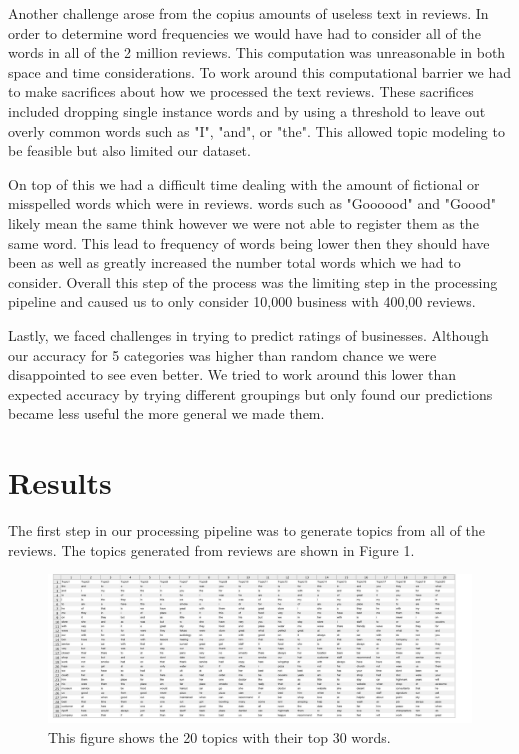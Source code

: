 \documentclass{article}
\begin{document}
Another challenge arose from the copius amounts of useless text in reviews.  In order to determine word frequencies we would have had to consider all of the words in all of the 2 million reviews.  This computation was unreasonable in both space and time considerations.  To work around this computational barrier we had to make sacrifices about how we processed the text reviews.  These sacrifices included dropping single instance words and by using a threshold to leave out overly common words such as "I", "and", or "the".  This allowed topic modeling to be feasible but also limited our dataset.

On top of this we had a difficult time dealing with the amount of fictional or misspelled  words which were in reviews. words such as "Goooood" and "Goood" likely mean the same think however we were not able to register them as the same word. This lead to frequency of words being lower then they should have been as well as greatly increased the number total words which we had to consider. Overall this step of the process was the limiting step in the processing pipeline and caused us to only consider 10,000 business with 400,00 reviews.

Lastly, we faced challenges in trying to predict ratings of businesses.  Although our accuracy for 5 categories was higher than random chance we were disappointed to see even better.  We tried to work around this lower than expected accuracy by trying different groupings but only found our predictions became less useful the more general we made them.

\section{Results}

The first step in our processing pipeline was to generate topics from all of the reviews. The topics generated from reviews are shown in Figure 1.

\begin{figure}
\includegraphics[scale = .13]{topics}
\caption{This figure shows the 20 topics with their top 30 words.}
\end{figure}
\end{document}

